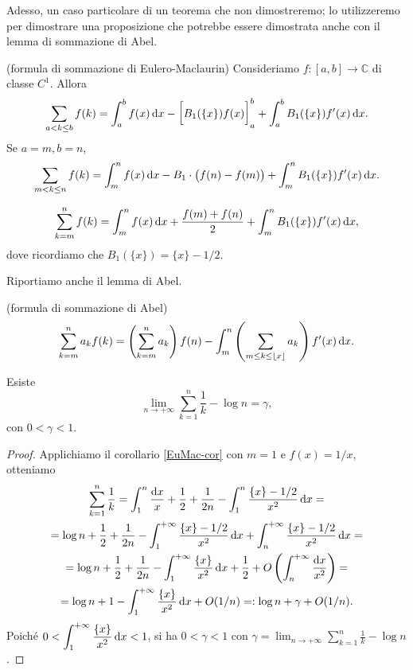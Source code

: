 Adesso, un caso particolare di un teorema che non dimostreremo; lo utilizzeremo per dimostrare una proposizione che potrebbe essere dimostrata anche con il lemma di sommazione di Abel.

\begin{thm}
  (formula di sommazione di Eulero-Maclaurin) Consideriamo $f:[a,b] \longrightarrow \mathbb{C}$ di classe $C^1$. Allora
  $$\sum_{a<k \le b}f(k)=\int_a^b f(x)\mathop{}\!\mathrm{d} x-\bigg[B_1(\{x\})f(x)\bigg]_a^b+\int_a^b B_1(\{x\})f'(x)\mathop{}\!\mathrm{d} x.$$
  Se $a=m, b=n$,
  $$\sum_{m<k \le n} f(k)=\int_m^nf(x)\mathop{}\!\mathrm{d} x-B_1\cdot\big(f(n)-f(m)\big)+\int_m^n B_1(\{x\})f'(x)\mathop{}\!\mathrm{d} x.$$
\end{thm}

\begin{cor} \label{EuMac-cor}
  $$\sum_{k=m}^n f(k)=\int_m^n f(x)\mathop{}\!\mathrm{d} x+\frac{f(m)+f(n)}{2}+\int_m^n B_1(\{x\})f'(x)\mathop{}\!\mathrm{d} x,$$
  dove ricordiamo che $B_1(\{x\})=\{x\}-1/2$.
\end{cor}

Riportiamo anche il lemma di Abel.

\begin{lm}
  (formula di sommazione di Abel)
  $$\sum_{k=m}^n a_kf(k)=\left(\sum_{k=m}^n a_k\right)f(n)-\int_m^n\left(\sum_{m \le k \le \lfloor x \rfloor}a_k\right)f'(x)\mathop{}\!\mathrm{d} x.$$
\end{lm}

\begin{prop}
  Esiste
  $$\lim_{n \longrightarrow +\infty} \sum_{k=1}^n \frac{1}{k}-\log{n}=\gamma,$$
  con $0<\gamma<1$.
\end{prop}

\begin{proof}
  Applichiamo il corollario \ref{EuMac-cor} con $m=1$ e $f(x)=1/x$, otteniamo
  \begin{gather*}
    \sum_{k=1}^n \frac{1}{k}=\int_1^n \frac{\mathop{}\!\mathrm{d} x}{x}+\frac{1}{2}+\frac{1}{2n}-\int_1^n \frac{\{x\}-1/2}{x^2}\mathop{}\!\mathrm{d} x= \\
    =\log{n}+\frac{1}{2}+\frac{1}{2n}-\int_1^{+\infty} \frac{\{x\}-1/2}{x^2}\mathop{}\!\mathrm{d} x+\int_n^{+\infty}\frac{\{x\}-1/2}{x^2}\mathop{}\!\mathrm{d} x= \\
    =\log{n}+\frac{1}{2}+\frac{1}{2n}-\int_1^{+\infty} \frac{\{x\}}{x^2}\mathop{}\!\mathrm{d} x+\frac{1}{2}+O\left(\int_n^{+\infty}\frac{\mathop{}\!\mathrm{d} x}{x^2}\right)= \\
    =\log{n}+1-\int_1^{+\infty} \frac{\{x\}}{x^2}\mathop{}\!\mathrm{d} x+O(1/n)=:\log{n}+\gamma+O(1/n).
  \end{gather*}
  Poiché $\displaystyle 0<\int_1^{+\infty} \frac{\{x\}}{x^2}\mathop{}\!\mathrm{d} x<1$, si ha $0<\gamma<1$ con $\displaystyle \gamma=\lim_{n \longrightarrow +\infty} \sum_{k=1}^n \frac{1}{k}-\log{n}$.
\end{proof}


